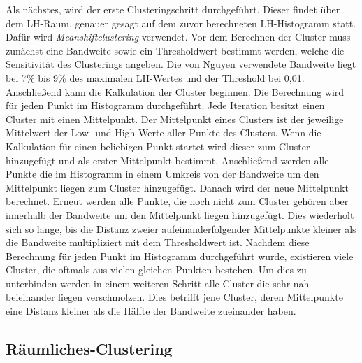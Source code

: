 Als nächstes, wird der erste Clusteringschritt durchgeführt. Dieser findet über dem LH-Raum, genauer gesagt auf dem zuvor berechneten LH-Histogramm statt. Dafür wird \textit{Meanshiftclustering} verwendet.
\newline
Vor dem Berechnen der Cluster muss zunächst eine Bandweite sowie ein Thresholdwert bestimmt werden, welche die Sensitivität des Clusterings angeben. Die von Nguyen \cite{nguyen2012clustering} verwendete Bandweite liegt bei 7\% bis 9\% des maximalen LH-Wertes und der Threshold bei 0,01. Anschließend kann die Kalkulation der Cluster beginnen.
\newline
Die Berechnung wird für jeden Punkt im Histogramm durchgeführt. Jede Iteration besitzt einen Cluster mit einen Mittelpunkt. Der Mittelpunkt eines Clusters ist der jeweilige Mittelwert der Low- und High-Werte aller Punkte des Clusters. Wenn die Kalkulation für einen beliebigen Punkt startet wird dieser zum Cluster hinzugefügt und als erster Mittelpunkt bestimmt. Anschließend werden alle Punkte die im Histogramm in einem Umkreis von der Bandweite um den Mittelpunkt liegen zum Cluster hinzugefügt. Danach wird der neue Mittelpunkt berechnet. Erneut werden alle Punkte, die noch nicht zum Cluster gehören aber innerhalb der Bandweite um den Mittelpunkt liegen hinzugefügt. Dies wiederholt sich so lange, bis die Distanz zweier aufeinanderfolgender Mittelpunkte kleiner als die Bandweite multipliziert mit dem Thresholdwert ist.
\newline
Nachdem diese Berechnung für jeden Punkt im Histogramm durchgeführt wurde, existieren viele Cluster, die oftmals aus vielen gleichen Punkten bestehen. Um dies zu unterbinden werden in einem weiteren Schritt alle Cluster die sehr nah beieinander liegen verschmolzen. Dies betrifft jene Cluster, deren Mittelpunkte eine Distanz kleiner als die Hälfte der Bandweite zueinander haben.



\subsection{Räumliches-Clustering}

